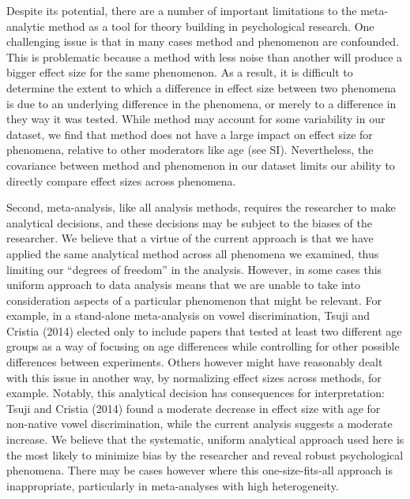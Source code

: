 \documentclass[9pt,twocolumn,twoside,lineno]{pnas-new}
\begin{document}
Despite its potential, there are a number of important limitations to
the meta-analytic method as a tool for theory building in psychological
research. One challenging issue is that in many cases method and
phenomenon are confounded. This is problematic because a method with
less noise than another will produce a bigger effect size for the same
phenomenon. As a result, it is difficult to determine the extent to
which a difference in effect size between two phenomena is due to an
underlying difference in the phenomena, or merely to a difference in
they way it was tested. While method may account for some variability in
our dataset, we find that method does not have a large impact on effect
size for phenomena, relative to other moderators like age (see SI).
Nevertheless, the covariance between method and phenomenon in our
dataset limits our ability to directly compare effect sizes across
phenomena.

Second, meta-analysis, like all analysis methods, requires the
researcher to make analytical decisions, and these decisions may be
subject to the biases of the researcher. We believe that a virtue of the
current approach is that we have applied the same analytical method
across all phenomena we examined, thus limiting our \enquote{degrees of
freedom} in the analysis. However, in some cases this uniform approach
to data analysis means that we are unable to take into consideration
aspects of a particular phenomenon that might be relevant. For example,
in a stand-alone meta-analysis on vowel discrimination, Tsuji and
Cristia (2014) elected only to include papers that tested at least two
different age groups as a way of focusing on age differences while
controlling for other possible differences between experiments. Others
however might have reasonably dealt with this issue in another way, by
normalizing effect sizes across methods, for example. Notably, this
analytical decision has consequences for interpretation: Tsuji and
Cristia (2014) found a moderate decrease in effect size with age for
non-native vowel discrimination, while the current analysis suggests a
moderate increase. We believe that the systematic, uniform analytical
approach used here is the most likely to minimize bias by the researcher
and reveal robust psychological phenomena. There may be cases however
where this one-size-fits-all approach is inappropriate, particularly in
meta-analyses with high heterogeneity.
\end{document}
